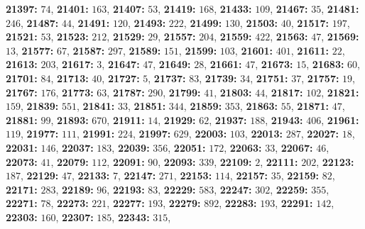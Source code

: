 \textsf{\bfseries 21397:} $74$, \textsf{\bfseries 21401:} $163$, \textsf{\bfseries 21407:} $53$, \textsf{\bfseries 21419:} $168$, \textsf{\bfseries 21433:} $109$, \textsf{\bfseries 21467:} $35$, \textsf{\bfseries 21481:} $246$, \textsf{\bfseries 21487:} $44$, \textsf{\bfseries 21491:} $120$, \textsf{\bfseries 21493:} $222$, \textsf{\bfseries 21499:} $130$, \textsf{\bfseries 21503:} $40$, \textsf{\bfseries 21517:} $197$, \textsf{\bfseries 21521:} $53$, \textsf{\bfseries 21523:} $212$, \textsf{\bfseries 21529:} $29$, \textsf{\bfseries 21557:} $204$, \textsf{\bfseries 21559:} $422$, \textsf{\bfseries 21563:} $47$, \textsf{\bfseries 21569:} $13$, \textsf{\bfseries 21577:} $67$, \textsf{\bfseries 21587:} $297$, \textsf{\bfseries 21589:} $151$, \textsf{\bfseries 21599:} $103$, \textsf{\bfseries 21601:} $401$, \textsf{\bfseries 21611:} $22$, \textsf{\bfseries 21613:} $203$, \textsf{\bfseries 21617:} $3$, \textsf{\bfseries 21647:} $47$, \textsf{\bfseries 21649:} $28$, \textsf{\bfseries 21661:} $47$, \textsf{\bfseries 21673:} $15$, \textsf{\bfseries 21683:} $60$, \textsf{\bfseries 21701:} $84$, \textsf{\bfseries 21713:} $40$, \textsf{\bfseries 21727:} $5$, \textsf{\bfseries 21737:} $83$, \textsf{\bfseries 21739:} $34$, \textsf{\bfseries 21751:} $37$, \textsf{\bfseries 21757:} $19$, \textsf{\bfseries 21767:} $176$, \textsf{\bfseries 21773:} $63$, \textsf{\bfseries 21787:} $290$, \textsf{\bfseries 21799:} $41$, \textsf{\bfseries 21803:} $44$, \textsf{\bfseries 21817:} $102$, \textsf{\bfseries 21821:} $159$, \textsf{\bfseries 21839:} $551$, \textsf{\bfseries 21841:} $33$, \textsf{\bfseries 21851:} $344$, \textsf{\bfseries 21859:} $353$, \textsf{\bfseries 21863:} $55$, \textsf{\bfseries 21871:} $47$, \textsf{\bfseries 21881:} $99$, \textsf{\bfseries 21893:} $670$, \textsf{\bfseries 21911:} $14$, \textsf{\bfseries 21929:} $62$, \textsf{\bfseries 21937:} $188$, \textsf{\bfseries 21943:} $406$, \textsf{\bfseries 21961:} $119$, \textsf{\bfseries 21977:} $111$, \textsf{\bfseries 21991:} $224$, \textsf{\bfseries 21997:} $629$, \textsf{\bfseries 22003:} $103$, \textsf{\bfseries 22013:} $287$, \textsf{\bfseries 22027:} $18$, \textsf{\bfseries 22031:} $146$, \textsf{\bfseries 22037:} $183$, \textsf{\bfseries 22039:} $356$, \textsf{\bfseries 22051:} $172$, \textsf{\bfseries 22063:} $33$, \textsf{\bfseries 22067:} $46$, \textsf{\bfseries 22073:} $41$, \textsf{\bfseries 22079:} $112$, \textsf{\bfseries 22091:} $90$, \textsf{\bfseries 22093:} $339$, \textsf{\bfseries 22109:} $2$, \textsf{\bfseries 22111:} $202$, \textsf{\bfseries 22123:} $187$, \textsf{\bfseries 22129:} $47$, \textsf{\bfseries 22133:} $7$, \textsf{\bfseries 22147:} $271$, \textsf{\bfseries 22153:} $114$, \textsf{\bfseries 22157:} $35$, \textsf{\bfseries 22159:} $82$, \textsf{\bfseries 22171:} $283$, \textsf{\bfseries 22189:} $96$, \textsf{\bfseries 22193:} $83$, \textsf{\bfseries 22229:} $583$, \textsf{\bfseries 22247:} $302$, \textsf{\bfseries 22259:} $355$, \textsf{\bfseries 22271:} $78$, \textsf{\bfseries 22273:} $221$, \textsf{\bfseries 22277:} $193$, \textsf{\bfseries 22279:} $892$, \textsf{\bfseries 22283:} $193$, \textsf{\bfseries 22291:} $142$, \textsf{\bfseries 22303:} $160$, \textsf{\bfseries 22307:} $185$, \textsf{\bfseries 22343:} $315$, 
